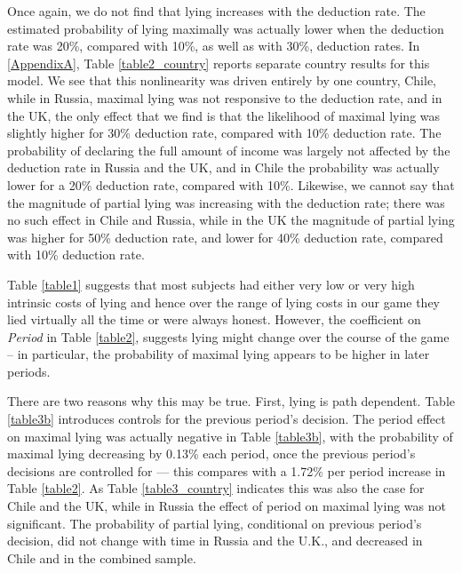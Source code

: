 \documentclass[12pt]{article}
\begin{document}
\par Once again, we do not find that lying increases with the deduction rate. The estimated probability of lying maximally was actually lower when the deduction rate was 20\%, compared with 10\%, as well as with 30\%, deduction rates. In \ref{AppendixA}, Table \ref{table2_country} reports separate country results for this model.  We see that this nonlinearity was driven entirely by one country, Chile, while in Russia, maximal lying was not responsive to the deduction rate, and in the UK, the only effect that we find is that the likelihood of maximal lying was slightly higher for 30\% deduction rate, compared with 10\% deduction rate.
The probability of declaring the full amount of income was largely not affected by the deduction rate in Russia and the UK, and in Chile the probability was actually lower for a 20\% deduction rate, compared with 10\%. Likewise, we cannot say that the magnitude of partial lying was increasing with the deduction rate; there was no such effect in Chile and Russia, while in the UK the magnitude of partial lying was higher for 50\% deduction rate, and lower for 40\% deduction rate, compared with 10\% deduction rate. 

\par Table \ref{table1} suggests that most subjects had either very low or very high intrinsic costs of lying and hence over the range of lying costs in our game they lied virtually all the time or were always honest. However, the coefficient on {\it Period} in  Table \ref{table2}, suggests lying might change over the course of the game -- in particular, the probability of maximal lying appears to be higher in later periods. 

\par There are two reasons why this may be true. First, lying is path dependent.  Table \ref{table3b} introduces controls for the previous period's decision. The period effect on maximal lying was actually negative in Table \ref{table3b}, with the probability of maximal lying decreasing by 0.13\% each period, once the previous period's decisions are controlled for --- this compares with a 1.72\% per period increase in Table \ref{table2}. 
As Table \ref{table3_country} indicates this was also the case for Chile and the UK, while in Russia the effect of period on maximal lying was not significant.  
The probability of partial lying, conditional on previous period's decision, did not change with time in Russia and the U.K., and decreased in Chile and in the combined sample. 
\end{document}
